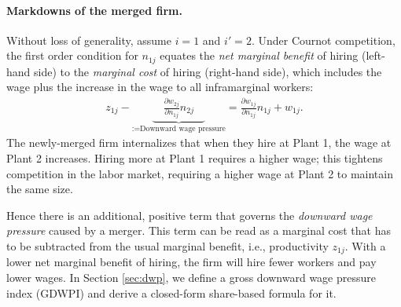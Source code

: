 \documentclass[12pt]{article}
\theoremstyle{prop}
\begin{document}
\paragraph{Markdowns of the merged firm.}
Without loss of generality, assume $i=1$ and $i'=2$.
Under Cournot competition, the first order condition for $n_{1j}$ equates the \emph{net marginal benefit} of hiring (left-hand side) to the \emph{marginal cost} of hiring (right-hand side), which includes the wage plus the increase in the wage to all inframarginal workers:
\begin{align}
	\label{eq:merger_foc}
z_{1j}-\underbrace{\quad\frac{\partial w_{2j}}{\partial n_{1j}}n_{2j}\quad}_{:=\text{Downward \ wage \ pressure}} =\frac{\partial w_{1j}}{\partial n_{1j}}n_{1j}+w_{1j}.
\end{align}
The newly-merged firm internalizes that when they hire at Plant 1, the wage at Plant 2 increases.
Hiring more at Plant 1 requires a higher wage; this tightens competition in the labor market, requiring a higher wage at Plant 2 to maintain the same size. 

Hence there is an additional, positive term that governs the \emph{downward wage pressure} caused by a merger. This term can be read as a marginal cost that has to be subtracted from the usual marginal benefit, i.e., productivity $z_{1j}$.
With a lower net marginal benefit of hiring, the firm will hire fewer workers and pay lower wages. 
In Section \ref{sec:dwp}, we define a gross downward wage pressure index (GDWPI) and derive a closed-form share-based formula for it.

\end{document}
